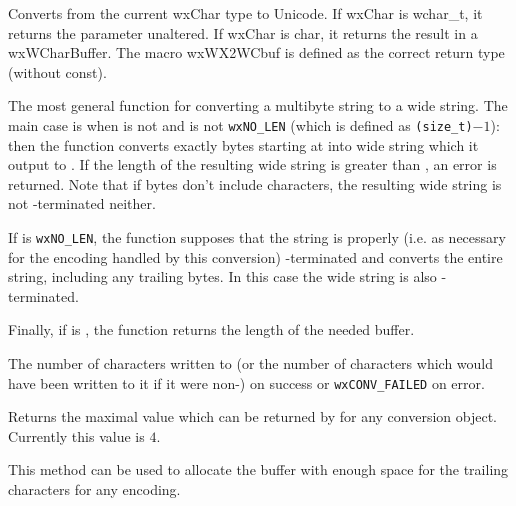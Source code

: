 
Converts from the current wxChar type to Unicode. If wxChar is wchar\_t,
it returns the parameter unaltered. If wxChar is char, it returns the
result in a wxWCharBuffer. The macro wxWX2WCbuf is defined as the correct
return type (without const).


\label{wxmbconvfromwchar}


The most general function for converting a multibyte string to a wide string.
The main case is when  is not \NULL and  is not 
\texttt{wxNO\_LEN} (which is defined as \texttt{(size\_t)$-1$}): then
the function converts exactly  bytes starting at  into
wide string which it output to . If the length of the resulting wide
string is greater than , an error is returned. Note that if 
 bytes don't include \NUL characters, the resulting wide string is
not \NUL-terminated neither.

If  is \texttt{wxNO\_LEN}, the function supposes that the string is
properly (i.e. as necessary for the encoding handled by this conversion) 
\NUL-terminated and converts the entire string, including any trailing \NUL 
bytes. In this case the wide string is also \NUL-terminated.

Finally, if  is \NULL, the function returns the length of the needed
buffer.


The number of characters written to  (or the number of characters
which would have been written to it if it were non-\NULL) on success or 
\texttt{wxCONV\_FAILED} on error.


\label{wxmbconvgetmaxmbnullen}


Returns the maximal value which can be returned by 
 for any conversion object. Currently
this value is $4$.

This method can be used to allocate the buffer with enough space for the
trailing \NUL characters for any encoding.


\label{wxmbconvgetmbnullen}

